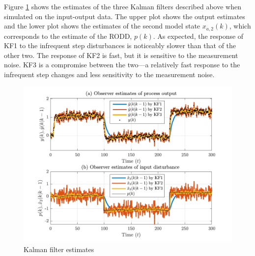 Figure \ref{fig:sim-sys-siso-KF123-est} shows the estimates of the three Kalman filters described above when simulated on the input-output data. The upper plot shows the output estimates and the lower plot shows the estimates of the second model state $x_{a,2}(k)$, which corresponds to the estimate of the RODD, $p(k)$. As expected, the response of KF1 to the infrequent step disturbances is noticeably slower than that of the other two. The response of KF2 is fast, but it is sensitive to the measurement noise. KF3 is a compromise between the two—a relatively fast response to the infrequent step changes and less sensitivity to the measurement noise.
\begin{figure}[htp]
	\centering
	\includegraphics[width=14cm]{images/rod_obs_sim1_y_est1.pdf}
	\caption{Kalman filter estimates}
	\label{fig:sim-sys-siso-KF123-est}
\end{figure}


